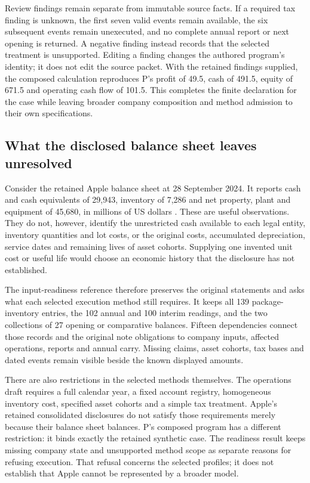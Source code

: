 Review findings remain separate from immutable source facts. If a required
tax finding is unknown, the first seven valid events remain available,
the six subsequent events remain unexecuted, and no complete annual report
or next opening is returned. A negative finding instead records that the
selected treatment is unsupported. Editing a finding changes the authored
program's identity; it does not edit the source packet. With the retained
findings supplied, the composed calculation reproduces P's profit of 49.5,
cash of 491.5, equity of 671.5 and operating cash flow of 101.5. This
completes the finite declaration for the case while leaving broader company
composition and method admission to their own specifications.

\subsection{What the disclosed balance sheet leaves unresolved}

Consider the retained Apple balance sheet at 28 September 2024. It reports
cash and cash equivalents of 29,943, inventory of 7,286 and net property,
plant and equipment of 45,680, in millions of US dollars
\citep[p.~31]{apple2024}. These are useful observations. They do not, however,
identify the unrestricted cash available to each legal entity, inventory
quantities and lot costs, or the original costs, accumulated depreciation,
service dates and remaining lives of asset cohorts. Supplying one invented
unit cost or useful life would choose an economic history that the
disclosure has not established.

The input-readiness reference therefore preserves the original statements
and asks what each selected execution method still requires. It keeps all
139 package-inventory entries, the 102 annual and 100 interim readings,
and the two collections of 27 opening or comparative balances. Fifteen
dependencies connect those records and the original note obligations to
company inputs, affected operations, reports and annual carry. Missing
claims, asset cohorts, tax bases and dated events remain visible beside the
known displayed amounts.

There are also restrictions in the selected methods themselves. The
operations draft requires a full calendar year, a fixed account registry,
homogeneous inventory cost, specified asset cohorts and a simple tax
treatment. Apple's retained consolidated disclosures do not satisfy those
requirements merely because their balance sheet balances. P's composed
program has a different restriction: it binds exactly the retained
synthetic case. The readiness result keeps missing company state and
unsupported method scope as separate reasons for refusing execution.
That refusal concerns the selected profiles; it does not establish that
Apple cannot be represented by a broader model.

